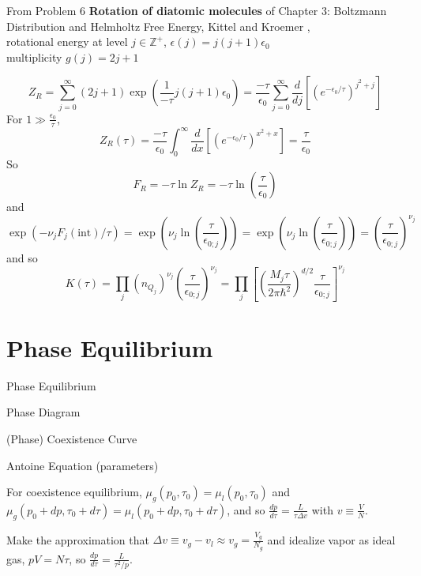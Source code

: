 \documentclass[10pt]{amsart}
\begin{document}
\begin{multicols*}{2}
From Problem 6 \textbf{Rotation of diatomic molecules} of Chapter 3: Boltzmann Distribution and Helmholtz Free Energy, Kittel and Kroemer \cite{CKittelHKroemer1980}, \\
rotational energy at level $j\in \mathbb{Z}^+$, $\epsilon(j) = j(j+1) \epsilon_0$ \\
multiplicity $g(j) = 2j+1$

\[
Z_R = \sum_{j=0}^{\infty} (2j+1)\exp{ \left( \frac{1}{-\tau} j(j+1) \epsilon_0 \right) } = \frac{-\tau}{\epsilon_0} \sum_{j=0}^{\infty} \frac{d}{dj} \left[ (e^{-\epsilon_0 /\tau})^{j^2+j} \right] 
\]
For $1 \gg \frac{\epsilon_0}{\tau}$, 
\[
Z_R(\tau) = \frac{-\tau}{\epsilon_0} \int_0^{\infty} \frac{d}{dx} \left[ (e^{-\epsilon_0/\tau})^{x^2 + x} \right] = \frac{\tau}{\epsilon_0}
\]
So 
\[
F_R = -\tau \ln{Z_R} = -\tau \ln{ \left( \frac{\tau}{\epsilon_0} \right)}
\]
and 
\[
\exp{ (-\nu_j F_j(\text{int})/\tau) } = \exp{ ( \nu_j \ln{ \left( \frac{\tau}{\epsilon_{0;j}} \right) } ) } = \exp{ ( \nu_j \ln{ \left( \frac{\tau}{\epsilon_{0;j}} \right) } ) } = \left( \frac{\tau}{\epsilon_{0;j} } \right)^{\nu_j}
\]
and so 
\[
K(\tau) = \prod_j (n_{Q_j})^{\nu_j} \left( \frac{\tau}{\epsilon_{0;j}} \right)^{\nu_j} = \prod_j \left[ \left( \frac{ M_j \tau }{ 2\pi \hbar^2} \right)^{d/2} \frac{\tau}{ \epsilon_{0;j} } \right]^{\nu_j}
\]





\section{Phase Equilibrium}


\begin{description}
\item Phase Equilibrium
\item Phase Diagram
\item (Phase) Coexistence Curve 
\item Antoine Equation (parameters)
\end{description}


For coexistence equilibrium, $\mu_g(p_0,\tau_0) = \mu_l(p_0,\tau_0)$ and $\mu_g(p_0 + dp, \tau_0 + d\tau) = \mu_l(p_0 + dp, \tau_0+d\tau)$, and so $\frac{dp}{d\tau} = \frac{L}{ \tau \Delta v}$ with $v \equiv \frac{V}{N}$.  

Make the approximation that $\Delta v \equiv v_g - v_l \approx v_g = \frac{V_g}{N_g}$ and idealize vapor as ideal gas, $pV = N\tau$, so $\frac{dp}{d\tau} = \frac{L}{\tau^2/p}$.  


\end{multicols*}
\end{document}
